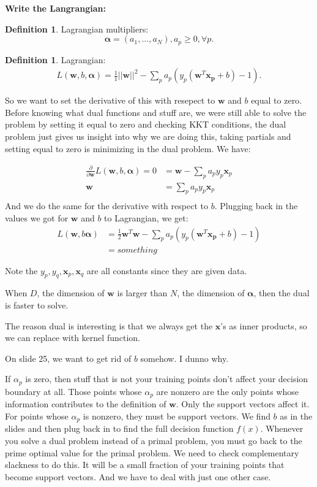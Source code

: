 \documentclass{amsbook}
\theoremstyle{plain}
\numberwithin{section}{chapter}
\numberwithin{equation}{chapter}
\theoremstyle{definition}
\newtheorem{Def}[theorem]{Definition}
\theoremstyle{remark}
\newcommand{\vecc}{\mathbf}
\newcommand{\bee}{\begin{equation}\begin{aligned}}
\newcommand{\eee}{\end{aligned}\end{equation}}
\newcommand{\fracc}{\frac}
\begin{document}
\textbf{Write the Langrangian: }


\begin{Def}
Lagrangian multipliers:
$$
\vecc{\alpha} = (a_1,...,a_N), a_p \geq 0 ,\forall p.
$$
\end{Def}

\begin{Def}
Lagrangian:
\bee
L(\vecc{w},b,\vecc{\alpha}) = \fracc{1}{1}||\vecc{w}||^2 - \sum_p a_p (y_p(\vecc{w}^T\vecc{x_p} + b) - 1).
\eee
\end{Def}

So we want to set the derivative of this with resepect to $\vecc{w}$ and $b$ equal to zero. Before knowing what dual functions and stuff are, we were still able to solve the problem by setting it equal to zero and checking KKT conditions, the dual problem just gives us insight into why we are doing this, taking partials and setting equal to zero is minimizing in the dual problem. We have:

\bee
\fracc{\partial}{\partial \vecc{w}} L(\vecc{w},b,\vecc{\alpha}) = 0 &= \vecc{w} - \sum_p a_py_p \vecc{x}_p\\
\vecc{w} &= \sum_p a_py_p \vecc{x}_p\\
\eee
And we do the same for the derivative with respect to $b$. Plugging back in the values we got for $\vecc{w}$ and $b$ to Lagrangian, we get: 
\bee
L(\vecc{w},b\vecc{\alpha}) &= \fracc{1}{2}\vecc{w}^T\vecc{w} - \sum_p a_p (y_p(\vecc{w}^T\vecc{x_p} + b) - 1)\\
&= something
\eee

Note the $y_p,y_q,\vecc{x}_p,\vecc{x}_q$ are all constants since they are given data. 

When $D$, the dimension of $\vecc{w}$ is larger than $N$, the dimension of $\vecc{\alpha}$, then the dual is faster to solve. 

The reason dual is interesting is that we always get the $\vecc{x}$'s as inner products, so we can replace with kernel function. 

On slide 25, we want to get rid of $b$ somehow. I dunno why. 


If $\alpha_p$ is zero, then stuff that is not your training points don't affect your decision boundary at all. Those points whose $\alpha_p$ are nonzero are the only points whose information contributes to the definition of $\vecc{w}$. Only the support vectors affect it. For points whose $\alpha_p$ is nonzero, they must be support vectors. We find $b$ as in the slides and then plug back in to find the full decision function $f(x)$. Whenever you solve a dual problem instead of a primal problem, you must go back to the prime optimal value for the primal problem. We need to check complementary slackness to do this. It will be a small fraction of your training points that become support vectors. And we have to deal with just one other case. 
\end{document}
